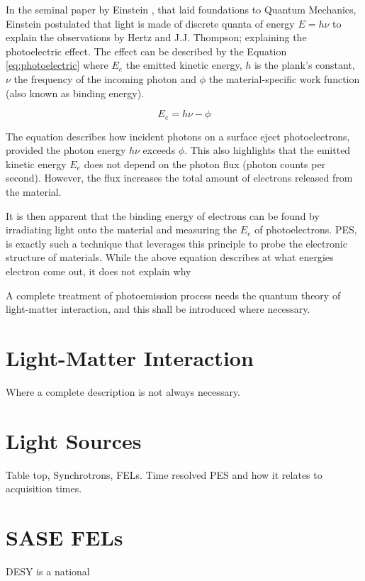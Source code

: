 In the seminal paper by Einstein \cite{einsteinUberErzeugungUnd1905}, that laid foundations to Quantum Mechanics, Einstein postulated that light is made of discrete quanta of energy $E = h\nu$ to explain the observations by Hertz and J.J. Thompson; explaining the photoelectric effect. The effect can be described by the Equation \ref{eq:photoelectric} where $E_e$ the emitted kinetic energy, $h$ is the plank's constant, $\nu$ the frequency of the incoming photon and  $\phi$ the material-specific work function (also known as binding energy). 

\begin{equation}\label{eq:photoelectric}
    E_e = h\nu - \phi
\end{equation}

The equation describes how incident photons on a surface eject photoelectrons, provided the photon energy $h\nu$ exceeds $\phi$. This also highlights that the emitted kinetic energy $E_e$ does not depend on the photon flux (photon counts per second). However, the flux increases the total amount of electrons released from the material.

It is then apparent that the binding energy of electrons can be found by irradiating light onto the material and measuring the $E_e$ of photoelectrons. \gls{PES}, is exactly such a technique that leverages this principle to probe the electronic structure of materials. While the above equation describes at what energies electron come out, it does not explain why 



A complete treatment of photoemission process needs the quantum theory of light-matter interaction, and this shall be introduced where necessary. 

\section{Light-Matter Interaction}\label{section:light-matter-interaction}
Where a complete description is not always necessary.

\section{Light Sources}\label{section:light-sources}
Table top, Synchrotrons, FELs. Time resolved PES and how it relates to acquisition times.


\section{SASE FELs}
\gls*{DESY} is a national 

